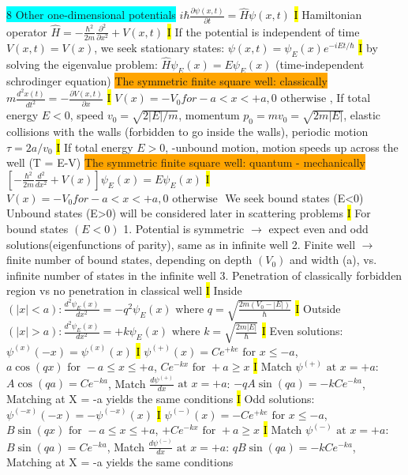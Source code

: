 \documentclass[fontsize=4pt]{scrartcl}
\begin{document}
\colorbox{Cyan}{8 Other one-dimensional potentials}
$i\hbar \frac{\partial \psi(x,t)}{\partial t} = \hat{H} \psi(x,t)$
\hl{I}
Hamiltonian operator $\hat{H} = -\frac{\hbar^2}{2m}\frac{\partial^2}{\partial x^2} + V(x,t)$
\hl{I}
If the potential is independent of time $V(x,t) = V(x)$, we seek stationary states: $\psi(x,t) = \psi_E (x) e^{-iEt/\hbar}$
\hl{I}
by solving the eigenvalue problem: $\hat{H}\psi_E (x) = E\psi_E(x)$ (time-independent schrodinger equation)
\colorbox{Orange}{The symmetric finite square well: classically}
$m\frac{d^2 x(t)}{dt^2} = -\frac{\partial V (x,t)}{\partial x}$
\hl{I}
$V(x) = -V_0 for -a <x<+a, 0 \text{ otherwise }$, If total energy  $E<0$, speed $v_0 = \sqrt{2|E|/m}$, momentum $p_0 = mv_0 = \sqrt{2m |E|}$, elastic collisions with the walls (forbidden to go inside the walls), periodic motion $\tau = 2a/v_0$ 
\hl{I}
If total energy $E > 0$, -unbound motion, motion speeds up across the well (T = E-V)
\colorbox{Orange}{The symmetric finite square well: quantum - mechanically}
$[-\frac{\hbar^2}{2m}\frac{d^2}{dx^2}+V(x)] \psi_E(x) = E \psi_E (x)$
\hl{I}
$V(x) = -V_0 for -a <x<+a, 0 \text{ otherwise }$
We seek bound states (E<0) Unbound states (E>0) will be considered later in scattering problems
\hl{I}
For bound states $(E<0)$ 1. Potential is symmetric $\rightarrow$ expect even and odd solutions(eigenfunctions of parity), same as in infinite well
2. Finite well $\rightarrow$ finite number of bound states, depending on depth $(V_0)$ and width (a), vs. infinite number of states in the infinite well
3. Penetration of classically forbidden region vs no penetration in classical well
\hl{I}
Inside $(|x| < a): \frac{d^2 \psi_E (x)}{dx^2} = -q^2 \psi_E (x) \text{ where } q = \sqrt{\frac{2m(V_0 - |E|)}{\hbar}}$
\hl{I}
Outside $(|x|>a): \frac{d^2 \psi_E(x)}{dx^2}=+k \psi_E (x) \text{ where } k= \sqrt{\frac{2m|E|}{\hbar}}$
\hl{I}
Even solutions: $\psi^{(x)}(-x) = \psi^{(x)} (x)$
\hl{I}
$\psi^{(+)}(x) = Ce^{+ke} \text { for } x \leq -a$, $a\cos(qx) \text{ for } -a \leq x \leq +a$, $Ce^{-kx} \text { for } +a \geq x$
\hl{I}
Match $\psi^{(+)}  \text{ at } x = +a$:  $A\cos(qa) = Ce^{-ka}$,  Match $\frac{d\psi^{(+)}}{dx}  \text{ at } x = +a$:  $-qA\sin(qa) = -kCe^{-ka}$, Matching at X = -a yields the same conditions
\hl{I}
Odd solutions: $\psi^{(-x)}(-x) = -\psi^{(-x)} (x)$
\hl{I}
$\psi^{(-)}(x) = -Ce^{+ke} \text { for } x \leq -a$, $B\sin(qx) \text{ for } -a \leq x \leq +a$, $+Ce^{-kx} \text { for } +a \geq x$
\hl{I}
Match $\psi^{(-)}  \text{ at } x = +a$:  $B\sin(qa) = Ce^{-ka}$,  Match $\frac{d\psi^{(-)}}{dx}  \text{ at } x = +a$:  $qB\sin(qa) = -kCe^{-ka}$, Matching at X = -a yields the same conditions
\end{document}
